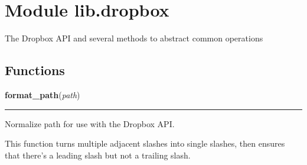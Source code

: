 %
%
%


\section{Module lib.dropbox}

    \label{lib:dropbox}
The Dropbox API and several methods to abstract common operations



  \subsection{Functions}

    \label{lib:dropbox:format_path}

    \vspace{0.5ex}

\hspace{.8\funcindent}\begin{boxedminipage}{\funcwidth}

    \raggedright \textbf{format\_path}(\textit{path})

    \vspace{-1.5ex}

    \rule{\textwidth}{0.5\fboxrule}
\setlength{\parskip}{2ex}
    Normalize path for use with the Dropbox API.

    This function turns multiple adjacent slashes into single slashes, then
    ensures that there's a leading slash but not a trailing slash.

\setlength{\parskip}{1ex}
    \end{boxedminipage}

    \label{lib:dropbox:match_hostname}


